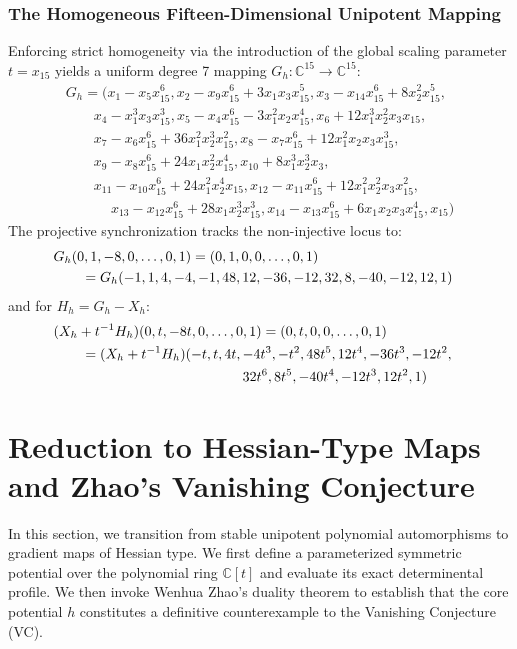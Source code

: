 \documentclass[11pt,a4paper]{article}
\begin{document}
\subsubsection{The Homogeneous Fifteen-Dimensional Unipotent Mapping}
Enforcing strict homogeneity via the introduction of the global scaling parameter $t = x_{15}$ yields a uniform degree 7 mapping $G_h: \mathbb{C}^{15} \to \mathbb{C}^{15}$:
\begin{gather*}
G_h = \big(x_1-x_5x_{15}^6, x_2-x_9x_{15}^6+3x_1x_3x_{15}^5, x_3-x_{14}x_{15}^6+8x_2^2x_{15}^5, \\
\qquad x_4-x_1^3x_3x_{15}^3, x_5-x_4x_{15}^6-3x_1^2x_2x_{15}^4, x_6+12x_1^3x_2^2x_3x_{15}, \\
\qquad x_7-x_6x_{15}^6+36x_1^2x_2^3x_{15}^2, x_8-x_7x_{15}^6+12x_1^2x_2x_3x_{15}^3, \\
\qquad x_9-x_8x_{15}^6+24x_1x_2^2x_{15}^4, x_{10}+8x_1^3x_2^3x_3, \\
\qquad x_{11}-x_{10}x_{15}^6+24x_1^2x_2^4x_{15}, x_{12}-x_{11}x_{15}^6+12x_1^2x_2^2x_3x_{15}^2,  \\
\qquad\quad~ x_{13}-x_{12}x_{15}^6+28x_1x_2^3x_{15}^3, x_{14}-x_{13}x_{15}^6+6x_1x_2x_3x_{15}^4, x_{15}\big)
\end{gather*}
The projective synchronization tracks the non-injective locus to:
\begin{align*}
\lefteqn{G_h(0,1,-8,0,\ldots,0,1) = (0,1,0,0,\ldots,0,1)} \\
&\qquad= G_h(-1,1,4,-4,-1,48,12,-36,-12,32,8,-40,-12,12,1)
\end{align*}
and for $H_h = G_h - X_h$:
\begin{align*}
\lefteqn{(X_h + t^{-1}H_h)(0,t,-8t,0,\ldots,0,1) = (0,t,0,0,\ldots,0,1)} \\
&\qquad= (X_h + t^{-1}H_h)(-t,t,4t,-4t^3,-t^2,48t^5,12t^4,-36t^3,-12t^2, \\
&\qquad\hphantom{{}= (X_h + t^{-1}H_h)(-t,t,4t,{}}32t^6,8t^5,-40t^4,-12t^3,12t^2,1)
\end{align*}



\section{Reduction to Hessian-Type Maps and Zhao's Vanishing Conjecture}
\label{sec:gradient_reduction}

In this section, we transition from stable unipotent polynomial automorphisms to gradient maps of Hessian type. We first define a parameterized symmetric potential over the polynomial ring $\mathbb{C}[t]$ and evaluate its exact determinental profile. We then invoke Wenhua Zhao's duality theorem to establish that the core potential $h$ constitutes a definitive counterexample to the Vanishing Conjecture (VC). 
\end{document}
